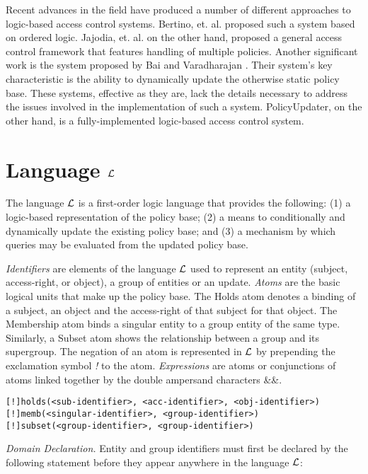 \documentclass{llncs}
\begin{document}
    Recent advances in the field have produced a number of different approaches
    to logic-based access control systems. Bertino, et. al. \cite{BER} proposed
    such a system based on ordered logic. Jajodia, et. al. \cite{JAJ} on the 
    other hand, proposed a general access control framework that features
    handling of multiple policies. Another significant work is the system
    proposed by Bai and Varadharajan \cite{BAI}. Their system's key
    characteristic is the ability to dynamically update the otherwise static
    policy base. These systems, effective as they are, lack the details
    necessary to address the issues involved in the implementation of such
    a system. PolicyUpdater, on the other hand, is a fully-implemented
    logic-based access control system.

  \section{Language $\cal{L}$}

    The language $\cal{L}$ is a first-order logic language that provides the
    following:  (1) a logic-based representation of the policy base; (2) a
    means to conditionally and dynamically update the existing policy base;
    and (3) a mechanism by which queries may be evaluated from the updated
    policy base.

    \emph{Identifiers} are elements of the language $\cal{L}$ used to represent
    an entity (subject, access-right, or object), a group of entities or an
    update. \emph{Atoms} are the basic logical units that make up the
    policy base. The Holds atom denotes a binding of a subject, an object
    and the access-right of that subject for that object. The Membership
    atom binds a singular entity to a group entity of the same type.
    Similarly, a Subset atom shows the relationship between a group and
    its supergroup. The negation of an atom is represented in $\cal{L}$ by
    prepending the exclamation symbol \emph{!} to the atom. \emph{Expressions}
    are atoms or conjunctions of atoms linked together by the double ampersand
    characters \&\&.

    \begin{verbatim}
[!]holds(<sub-identifier>, <acc-identifier>, <obj-identifier>)
[!]memb(<singular-identifier>, <group-identifier>)
[!]subset(<group-identifier>, <group-identifier>)
\end{verbatim}

    \noindent
    \emph{Domain Declaration.} Entity and group identifiers must first be
    declared by the following statement before they appear anywhere in the
    language $\cal{L}$:
\end{document}
